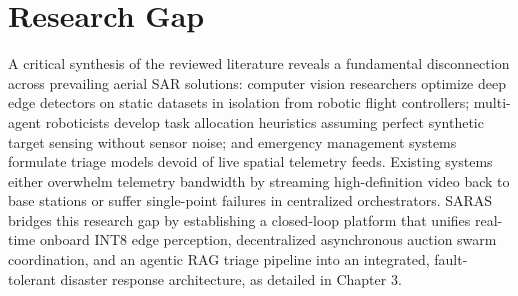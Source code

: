 \begin{table}[htbp]
\centering
\caption{Comparative analysis of state-of-the-art methodologies and the proposed SARAS platform}
\label{tab:lit_comparison}
\vspace{0.2cm}
\end{table}

\section{Research Gap}

A critical synthesis of the reviewed literature reveals a fundamental disconnection across prevailing aerial SAR solutions: computer vision researchers optimize deep edge detectors on static datasets in isolation from robotic flight controllers; multi-agent roboticists develop task allocation heuristics assuming perfect synthetic target sensing without sensor noise; and emergency management systems formulate triage models devoid of live spatial telemetry feeds. Existing systems either overwhelm telemetry bandwidth by streaming high-definition video back to base stations or suffer single-point failures in centralized orchestrators. SARAS bridges this research gap by establishing a closed-loop platform that unifies real-time onboard INT8 edge perception, decentralized asynchronous auction swarm coordination, and an agentic RAG triage pipeline into an integrated, fault-tolerant disaster response architecture, as detailed in Chapter 3.
